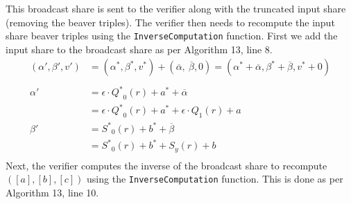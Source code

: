 \documentclass[twoside,11pt,openright]{report}
\theoremstyle{definition}
\theoremstyle{plain}
\begin{document}
This broadcast share is sent to the verifier along with the truncated input share (removing the beaver triples). The verifier then needs to recompute the input share beaver triples using the \texttt{InverseComputation} function. First we add the input share to the broadcast share as per Algorithm 13, line 8.
\begin{align*}
  (\alpha', \beta', v') & = (\alpha^*, \beta^*, v^*) + (\overline{\alpha},\ \overline{\beta}, 0)
  = (\alpha^* + \overline{\alpha}, \beta^* + \overline{\beta}, v^* + 0)                          \\\\
  \alpha'               & = \epsilon \cdot {Q^*}_0(r) + a^* + \overline{\alpha}                  \\
                        & = \epsilon \cdot {Q^*}_0(r) + a^* + \epsilon \cdot Q_1(r) + a          \\
  \beta'                & = {S^*}_0(r) + b^* + \overline{\beta}                                  \\
                        & = {S^*}_0(r) + b^* + S_y(r) + b                                        \\
\end{align*}
Next, the verifier computes the inverse of the broadcast share to recompute $([a], [b], [c])$ using the \texttt{InverseComputation} function. This is done as per Algorithm 13, line 10.
\end{document}
